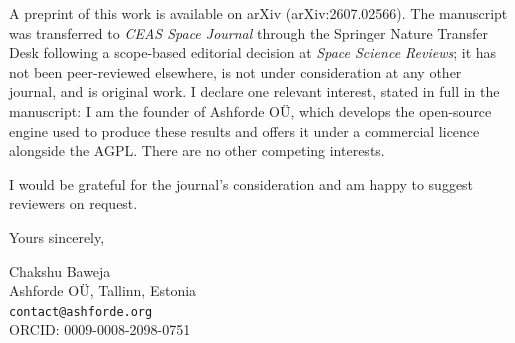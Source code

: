\documentclass[11pt]{article}
\begin{document}
A preprint of this work is available on arXiv (arXiv:2607.02566). The manuscript was
transferred to \emph{CEAS Space Journal} through the Springer Nature Transfer Desk
following a scope-based editorial decision at \emph{Space Science Reviews}; it has
not been peer-reviewed elsewhere, is not under consideration at any other journal,
and is original work. I declare one relevant interest, stated in full in the
manuscript: I am the founder of Ashforde O\"U, which develops the open-source engine
used to produce these results and offers it under a commercial licence alongside the
AGPL. There are no other competing interests.

I would be grateful for the journal's consideration and am happy to suggest
reviewers on request.

\medskip
\noindent Yours sincerely,

\medskip
\noindent Chakshu Baweja\\
Ashforde O\"U, Tallinn, Estonia\\
\texttt{contact@ashforde.org}\\
ORCID: 0009-0008-2098-0751
\end{document}
